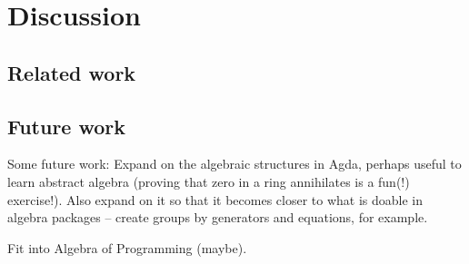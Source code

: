 \section{Discussion}
\subsection{Related work}
\subsection{Future work}
Some future work:
Expand on the algebraic structures in Agda, perhaps useful to learn abstract algebra (proving that zero in a ring annihilates is a fun(!) exercise!). Also expand on it so that it becomes closer to what is doable in algebra packages -- create groups by generators and equations, for example.

Fit into Algebra of Programming (maybe).

